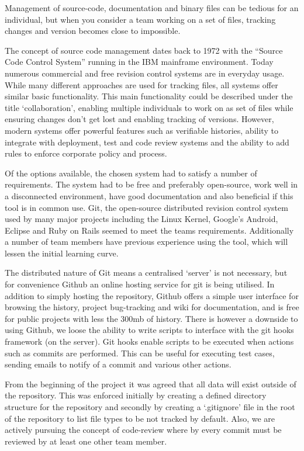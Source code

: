 Management of source-code, documentation and binary files can be tedious for an individual, but when you consider a team working on a set of files, tracking changes and version becomes close to impossible.

The concept of source code management dates back to 1972\cite{website:catb_org} with the “Source Code Control System” running in the IBM mainframe environment. Today numerous commercial and free revision control systems are in everyday usage. While many different approaches are used for tracking files, all systems offer similar basic functionality. This main functionality could be described under the title ‘collaboration’, enabling multiple individuals to work on as set of files while ensuring changes don’t get lost and enabling tracking of versions. However, modern systems offer powerful features such as verifiable histories, ability to integrate with deployment, test and code review systems and the ability to add rules to enforce corporate policy and process.

Of the options available, the chosen system had to satisfy a number of requirements. The system had to be free and preferably open-source, work well in a disconnected environment, have good documentation and also beneficial if this tool is in common use. Git\cite{website:git_scm}, the open-source distributed revision control system used by many major projects including the Linux Kernel, Google’s Android, Eclipse and Ruby on Rails seemed to meet the teams requirements. Additionally a number of team members have previous experience using the tool, which will lessen the initial learning curve.

The distributed nature of Git means a centralised ‘server’ is not necessary, but for convenience Github\cite{website:github} an online hosting service for git is being utilised. In addition to simply hosting the repository, Github offers a simple user interface for browsing the history, project bug-tracking and wiki for documentation, and is free for public projects with less the 300mb of history. There is however a downside to using Github, we loose the ability to write scripts to interface with the git hooks framework (on the server). Git hooks enable scripts to be executed when actions such as commits are performed. This can be useful for executing test cases, sending emails to notify of a commit and various other actions.

From the beginning of the project it was agreed that all data will exist outside of the repository. This was enforced initially by creating a defined directory structure for the repository and secondly by creating a ‘.gitignore’ file in the root of the repository to list file types to be not tracked by default. Also, we are actively pursuing the concept of code-review where by every commit must be reviewed by at least one other team member. 

